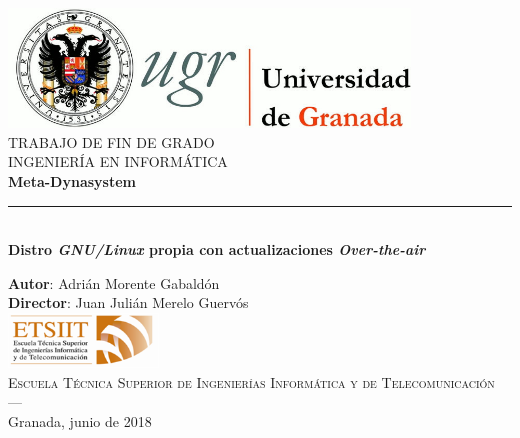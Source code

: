 \begin{titlepage}
	
	\newlength{\centeroffset}
	\setlength{\centeroffset}{-0.5\oddsidemargin}
	\addtolength{\centeroffset}{0.5\evensidemargin}
	\thispagestyle{empty}
	\noindent\hspace*{\centeroffset}
	
	\begin{minipage}{\textwidth}	
		\centering
		\includegraphics[width=0.8\textwidth]{imagenes/logo_ugr.jpg}\\[1.4cm]
		\textsc{\Large TRABAJO DE FIN DE GRADO\\[0.2cm]}
		\textsc{INGENIERÍA EN INFORMÁTICA}\\[1cm]
		{\Huge\bfseries Meta-Dynasystem\\}
		\noindent\rule[-1ex]{\textwidth}{3pt}\\[3.5ex]
		{\large\bfseries Distro \textit{GNU/Linux} propia con actualizaciones \textit{Over-the-air}}
	\end{minipage}
	
	\vspace{2.5cm}
	\noindent\hspace*{\centeroffset}\begin{minipage}{\textwidth}
	\centering
	
	\textbf{Autor}: {Adrián Morente Gabaldón}\\[2.5ex]
	\textbf{Director}: {Juan Julián Merelo Guervós}\\[1.5cm]
	\includegraphics[width=0.3\textwidth]{imagenes/etsiit_logo.png}\\[0.1cm]
	\textsc{Escuela Técnica Superior de Ingenierías Informática y de Telecomunicación}\\
	\textsc{---}\\
	Granada, junio de 2018
	\end{minipage}

\end{titlepage}